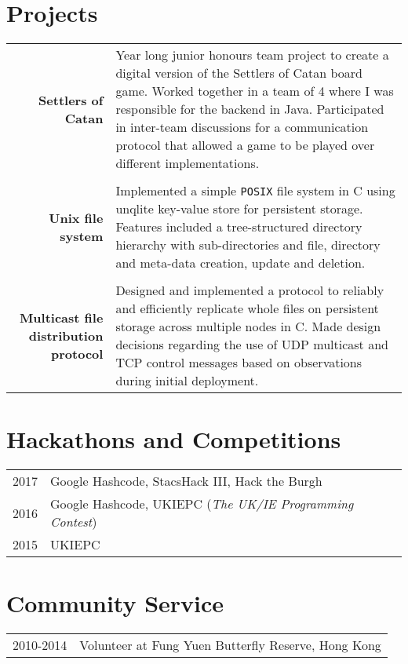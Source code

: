 \documentclass{article}
\begin{document}
\section*{Projects}
\begin{tabular}{R|p{14cm}}
\textbf{Settlers of Catan} & Year long junior honours team project to create a digital version of the Settlers of Catan board game. Worked together in a team of 4 where I was responsible for the backend in Java. Participated in inter-team discussions for a communication protocol that allowed a game to be played over different implementations. \\
 \\

\textbf{Unix file system} & Implemented a simple \texttt{POSIX} file system in C using unqlite key-value store for persistent storage. Features included a tree-structured directory hierarchy with sub-directories and file, directory and meta-data creation, update and deletion.\\
 \\

\textbf{Multicast file distribution protocol} & Designed and implemented a protocol to reliably and efficiently replicate whole files on persistent storage across multiple nodes in C. Made design decisions regarding the use of UDP multicast and TCP control messages based on observations during initial deployment.\\
\end{tabular}

\section*{Hackathons and Competitions}
\begin{tabular}{r|p{14cm}}
\textsc{2017} & Google Hashcode, StacsHack III, Hack the Burgh \\
\textsc{2016} & Google Hashcode, UKIEPC (\textit{The UK/IE Programming Contest}) \\
\textsc{2015} & UKIEPC \\
\end{tabular}
\section*{Community Service}
\begin{tabular}{r|p{14cm}}
\textsc{2010-2014} & Volunteer at Fung Yuen Butterfly Reserve, Hong Kong \\
\end{tabular}
\end{document}
